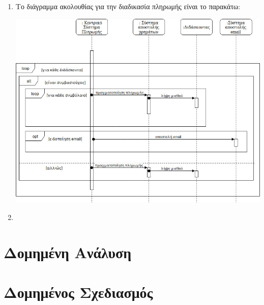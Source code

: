 \documentclass[12pt]{article}
\begin{document}
\begin{enumerate}
\item
Το διάγραμμα ακολουθίας για την διαδικασία πληρωμής είναι το παρακάτω:\\
\begin{center}
\includegraphics[scale=0.5]{sequence}
\end{center}

\item
\end{enumerate}


\section*{Δομημένη Ανάλυση}

\section*{Δομημένος Σχεδιασμός}
\end{document}
